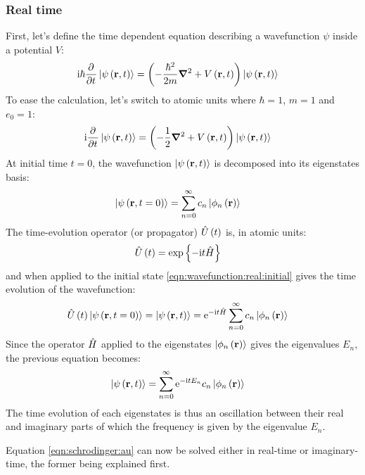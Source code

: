 \subsubsection{Real time}

First, let's define the time dependent \schrodinger equation describing a
wavefunction $\psi$ inside a potential $V$:
\begin{align}
\textrm{i} \hbar \frac{\partial^{{}}   }{\partial t^{{}}} \left| \psi\left( \textbf{r}, t \right) \right>
    & = \left( -\frac{\hbar^2}{2 m} \bm{\nabla}^2 + V\left( \textbf{r}, t \right)  \right) \left| \psi\left( \textbf{r},
t \right) \right>
\label{eqn:schrodinger:si}
\end{align}
To ease the calculation, let's switch to atomic units where $\hbar = 1$, $m
= 1$ and $e_0 = 1$:
\begin{align}
\textrm{i} \frac{\partial^{{}}   }{\partial t^{{}}} \left| \psi\left( \textbf{r}, t \right) \right>
    & = \left( -\frac{1}{2} \bm{\nabla}^2 + V\left( \textbf{r}, t \right)  \right) \left| \psi\left( \textbf{r}, t \right) \right>
\label{eqn:schrodinger:au}
\end{align}
At initial time $t = 0$, the wavefunction $\left| \psi\left( \textbf{r}, t \right) \right>$ is
decomposed into its eigenstates basis:
\begin{align}
\left| \psi\left( \textbf{r}, t=0 \right) \right> & = \sum_{n=0}^{\infty} c_n \left| \phi_n\left( \textbf{r} \right) \right>
\label{eqn:wavefunction:real:initial}
\end{align}
The time-evolution operator (or propagator) $\hat{U}\left( t \right)$ is, in atomic units:
\begin{align}
\hat{U}\left( t \right) & = \exp{ \left\{  - \textrm{i}t  \hat{H} \right\}}
\label{eqn:propagator:real}
\end{align}
and when applied to the initial state \eqref{eqn:wavefunction:real:initial}
gives the time evolution of the wavefunction:
\begin{align}
\hat{U}\left( t \right) \left| \psi\left( \textbf{r}, t=0 \right) \right>
    = \left| \psi\left( \textbf{r}, t \right) \right>
  & = \textrm{e}^{ - \textrm{i} t \hat{H} } \sum_{n=0}^{\infty} c_n \left| \phi_n\left( \textbf{r} \right) \right>
\end{align}
Since the operator $\hat{H}$ applied to the eigenstates
$\left| \phi_n\left( \textbf{r} \right) \right>$ gives the eigenvalues $E_n$, the previous equation
becomes:
\begin{align}
\left| \psi\left( \textbf{r}, t \right) \right>
 & = \sum_{n=0}^{\infty} \textrm{e}^{ - \textrm{i} t E_n } c_n \left| \phi_n\left( \textbf{r} \right) \right>
\label{eqn:wavefunction:eigenstates:time_evolution:real}
\end{align}
The time evolution of each eigenstates is thus an oscillation between their real
and imaginary parts of which the frequency is given by the eigenvalue $E_n$.



Equation \eqref{eqn:schrodinger:au} can now be solved either in real-time or
imaginary-time, the former being explained first.

